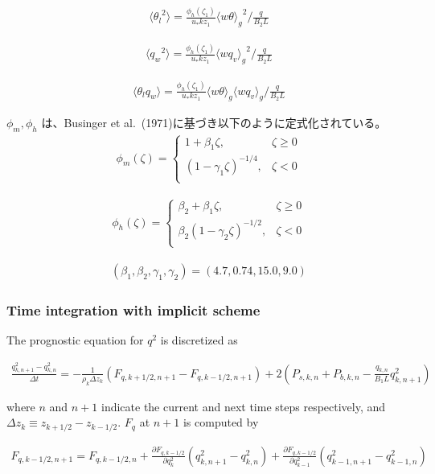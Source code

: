 \begin{eqnarray}\langle {\theta_l}^2\rangle=\frac{\phi_h\left(\zeta_1\right)}{u_*kz_1}{\langle w\theta \rangle_g}^2 \bigg/ \frac{q}{B_2L} \end{eqnarray}

\begin{eqnarray}\langle {q_w}^2\rangle=\frac{\phi_h\left(\zeta_1\right)}{u_*kz_1}{\langle wq_v\rangle_g}^2 \bigg/ \frac{q}{B_2L} \end{eqnarray}

\begin{eqnarray}\langle \theta_lq_w\rangle=\frac{\phi_h\left(\zeta_1\right)}{u_*kz_1}\langle w\theta \rangle_g\langle wq_v \rangle_g \bigg/ \frac{q}{B_2L} \end{eqnarray}

\(\phi_m,\phi_h\) は、Businger et al.~(1971)に基づき以下のように定式化されている。 \begin{eqnarray}
\phi_m(\zeta)=\left\{
    \begin{array}{lr}
      1+\beta_1\zeta, &\zeta\ge 0\\
      \left(1-\gamma_1\zeta\right)^{-1/4}, &\zeta< 0\\
    \end{array}
  \right.
\end{eqnarray}

\begin{eqnarray}
\phi_h(\zeta)=\left\{
    \begin{array}{lr}
      \beta_2+\beta_1\zeta, &\zeta\ge 0\\
      \beta_2\left(1-\gamma_2\zeta\right)^{-1/2}, &\zeta< 0\\
    \end{array}
  \right.
\end{eqnarray}

\begin{eqnarray}(\beta_1,\beta_2,\gamma_1,\gamma_2)=(4.7,0.74,15.0,9.0)\end{eqnarray}

\hypertarget{time-integration-with-implicit-scheme}{%
\subsubsection{Time integration with implicit scheme}\label{time-integration-with-implicit-scheme}}

The prognostic equation for \(q^2\) is discretized as

\begin{eqnarray} \frac{q^2_{k,n+1}-q^2_{k,n}}{\Delta t} = -\frac{1}{\rho_k\Delta z_k}\left(F_{q,k+1/2,n+1}-F_{q,k-1/2,n+1}\right) +2\left( P_{s,k,n} + P_{b,k,n} - \frac{q_{k,n}}{B_1L}q^2_{k,n+1}\right) \end{eqnarray}

where \(n\) and \(n+1\) indicate the current and next time steps respectively, and \(\Delta z_k \equiv z_{k+1/2}-z_{k-1/2}\). \(F_q\) at \(n+1\) is computed by

\begin{eqnarray} F_{q,k-1/2,n+1} = F_{q,k-1/2,n} + \frac{\partial F_{q,k-1/2}}{\partial q^2_k}(q^2_{k,n+1}-q^2_{k,n}) +  \frac{\partial F_{q,k-1/2}}{\partial q^2_{k-1}}(q^2_{k-1,n+1}-q^2_{k-1,n})\end{eqnarray}
